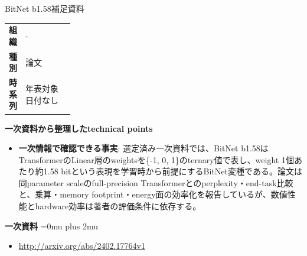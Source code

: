\Needspace{0.38\textheight}
\begin{technicalnote}{BitNet b1.58}{補足資料}
\begingroup
\begin{tabularx}{\linewidth}{@{}>{\bfseries}p{0.22\linewidth}X@{}}
組織 & - \\
種別 & 論文 \\
時系列 & 年表対象日付なし \\
\end{tabularx}
\smallskip
\begin{minipage}{\linewidth}
{\bfseries 一次資料から整理したtechnical points}
\begin{itemize}[leftmargin=1.5em,itemsep=0.35em]
\item \textbf{一次情報で確認できる事実}: 選定済み一次資料では、BitNet b1.58はTransformerのLinear層のweightsを\{-1, 0, 1\}のternary値で表し、weight 1個あたり約1.58 bitという表現を学習時から前提にするBitNet変種である。論文は同parameter scaleのfull-precision Transformerとのperplexity・end-task比較と、乗算・memory footprint・energy面の効率化を報告しているが、数値性能とhardware効率は著者の評価条件に依存する。
\end{itemize}
\begin{minipage}{\linewidth}
\begin{samepage}
{\bfseries 一次資料}
\begingroup\sloppy
\Urlmuskip=0mu plus 2mu\relax
\begin{itemize}[leftmargin=1.5em,itemsep=0.25em]
\item {\scriptsize\url{http://arxiv.org/abs/2402.17764v1}}
\end{itemize}
\endgroup
\end{samepage}
\end{minipage}
\end{minipage}
\endgroup
\end{technicalnote}
\medskip
